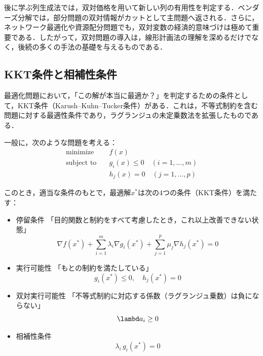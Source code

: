 後に学ぶ列生成法では，双対価格を用いて新しい列の有用性を判定する．ベンダーズ分解では，部分問題の双対情報がカットとして主問題へ返される．さらに，ネットワーク最適化や資源配分問題でも，双対変数の経済的意味づけは極めて重要である．したがって，双対問題の導入は，線形計画法の理解を深めるだけでなく，後続の多くの手法の基礎を与えるものである．

\subsection{KKT条件と相補性条件}

最適化問題において，「この解が本当に最適か？」を判定するための条件として，KKT条件（Karush--Kuhn--Tucker条件）がある．これは，不等式制約を含む問題に対する最適性条件であり，ラグランジュの未定乗数法を拡張したものである．

一般に，次のような問題を考える：
\begin{align}
\text{minimize}\quad&f(x)\\
\text{subject to}\quad&g_i(x)\le 0\quad(i=1,\dots,m)\\
&h_j(x)=0\quad(j=1,\dots,p)
\end{align}

このとき，適当な条件のもとで，最適解$x^*$は次の4つの条件（KKT条件）を満たす：

\begin{itemize}
\item [(1)]停留条件
「目的関数と制約をすべて考慮したとき，これ以上改善できない状態」
\begin{equation}
\nabla f(x^*)+\sum_{i=1}^m\lambda_i\nabla g_i(x^*)+\sum_{j=1}^p\mu_j\nabla h_j(x^*)=0
\end{equation}

\item [(2)]実行可能性
「もとの制約を満たしている」
\begin{equation}
g_i(x^*)\le 0,\quad h_j(x^*)=0
\end{equation}

\item [(3)]双対実行可能性
「不等式制約に対応する係数（ラグランジュ乗数）は負にならない」
\begin{equation}
\lambd a_i\ge 0
\end{equation}

\item [(4)]相補性条件
\begin{equation}
\lambda_i\,g_i(x^*)=0
\end{equation}
\end{itemize}

